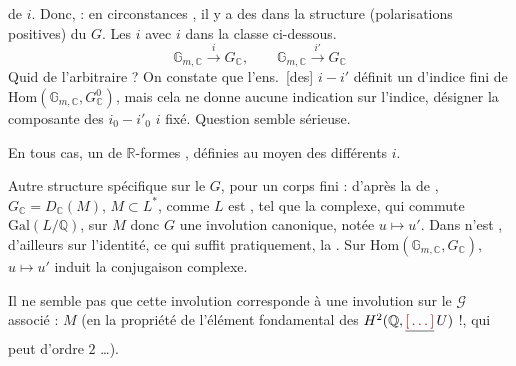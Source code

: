 \documentclass[11pt,a4paper]{article}
\begin{document}
de $i$. 
Donc,  : en  circonstances
, il y a des \ill{} dans la 
structure (polarisations positives) du $G$. Les $i$  avec $i$
dans la classe ci-dessous.
\[
  \mathbb{G}_{m,\mathbb{C}} \xrightarrow{\; i \;} G_{\mathbb{C}} ,
  \qquad
  \mathbb{G}_{m,\mathbb{C}} \xrightarrow{\; i' \;} G_{\mathbb{C}}
\]
Quid de l'arbitraire ? On constate que l'ens.\ [des] $i - i'$
 définit un
 d'indice fini de $\mathrm{Hom}(\mathbb{G}_{m,\mathbb{C}},
G^{0}_{\mathbb{C}})$, mais cela ne donne aucune indication sur l'indice,
 désigner la composante des $i_{0} - i'_{0}$ \ill{}
 $i$ fixé. Question semble sérieuse.

En tous cas, \ill{} un   de $\mathbb{R}$-formes
 , définies au moyen des différents
$i$.

Autre structure spécifique sur le $G$, pour  un corps fini :
d'après la  de \ill{}, $G_{\mathbb{C}} =
D_{\mathbb{C}}(M)$, $M \subset L^{*}$, comme $L$ est \ill{}, tel que la
 complexe, qui commute 
$\mathrm{Gal}(L/\mathbb{Q})$,  sur $M$ donc  $G$ une
involution canonique, notée $u \mapsto u'$. Dans \struck{\ill{}} \ill{}
n'est  , d'ailleurs  sur
\ill{} \ill{} l'identité, ce qui suffit pratiquement, la \ill{}. Sur
$\mathrm{Hom}(\mathbb{G}_{m,\mathbb{C}}, G_{\mathbb{C}})$, $u \mapsto u'$
induit la conjugaison complexe.

Il ne semble pas que cette involution corresponde à une involution sur le
 $\mathcal{G}$ associé : $M$ (en \struck{\ill{}}
 \ill{}  la propriété de
 \ill{}  \ill{} l'élément fondamental
 des $H^{2}(\mathbb{Q}, \struck{\ill{}}\,U)$ !, qui peut
 \ill{} d'ordre  $2$ …).
\end{document}
